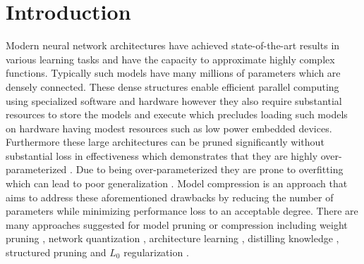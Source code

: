 \documentclass[final,1p,times]{elsarticle}
\begin{document}
\section{Introduction}
\label{s:Introduction}
Modern neural network architectures have achieved state-of-the-art results in various learning tasks and have the capacity to approximate highly complex functions. Typically such models have many millions of parameters which are densely connected. These dense structures enable efficient parallel computing using specialized software and hardware however they also require substantial resources to store the models and execute which precludes loading such models on hardware having modest resources such as low power embedded devices. Furthermore these large architectures can be pruned significantly without substantial loss in effectiveness which demonstrates that they are highly over-parameterized \cite{liu2018rethinking}. Due to being over-parameterized they are prone to overfitting which can lead to poor generalization \cite{45820}. Model compression is an approach that aims to address these aforementioned drawbacks by reducing the number of parameters while minimizing performance loss to an acceptable degree. There are many approaches suggested for model pruning or compression including weight pruning \cite{10.5555/2969239.2969366}, network quantization \cite{courbariaux2016binarized}, architecture learning \cite{DBLP:conf/bmvc/SrinivasB16}, distilling knowledge \cite{44873}, structured pruning \cite{NIPS2016_6504} and $L_0$ regularization \cite{louizos2018learning}. 
\end{document}
